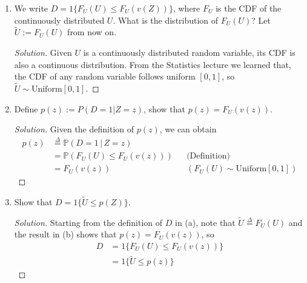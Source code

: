 \documentclass[11pt]{article}
\newenvironment{solution}{%
  \renewcommand\qedsymbol{$\blacksquare$}%
  \begin{mdframed}[backgroundcolor=gray!15]%
  \begin{proof}[Solution]}%
  {\end{proof}%
  \end{mdframed}}%
\newcommand{\pr}{\mathbb{P}}
\newcommand{\given}{\,|\,}
\newcommand{\defas}{\overset{\Delta}{=}}
\begin{document}
    \begin{enumerate}

        \item We write $D = 1\{F_U(U) \leq F_U(v(Z))\}$, where \( F_U \) is the CDF of the continuously distributed \( U \). What is the distribution of \( F_U(U) \)? Let \( \tilde{U} := F_U(U) \) from now on.
        
            \begin{solution}
                Given $U$ is a continuously distributed random variable, its CDF is also a continuous distribution. From the Statistics lecture we learned that, the CDF of any random variable follows uniform $[0,1]$, so $\tilde{U} \sim \text{Uniform}[0,1]$.
            \end{solution}
        
        \item Define \( p(z) := P(D = 1|Z = z) \), show that \( p(z) = F_U(v(z)) \).
        
            \begin{solution}
                Given the definition of $p(z)$, we can obtain
                \[ \begin{aligned}
                    p(z) &\defas \pr(D=1 \given Z=z) && \\
                         &= \pr(F_U(U) \leq F_U(v(z))) && \text{(Definition)} \\
                         &= F_U(v(z)) && (F_U(U) \sim \text{Uniform}[0,1])
                \end{aligned} \]
            \end{solution}
        
        \item Show that $D = 1\{\tilde{U} \leq p(Z)\}$.
        
            \begin{solution}
                Starting from the definition of $D$ in (a), note that $\tilde{U} \defas F_U(U)$ and the result in (b) shows that $p(z) = F_U(v(z))$, so
                \[ \begin{aligned}
                    D &= 1\{F_U(U) \leq F_U(v(z))\}  \\
                      &= 1\{\tilde{U} \leq p(z)\} 
                \end{aligned} \]
            \end{solution}
        
    \end{enumerate}
\end{document}
